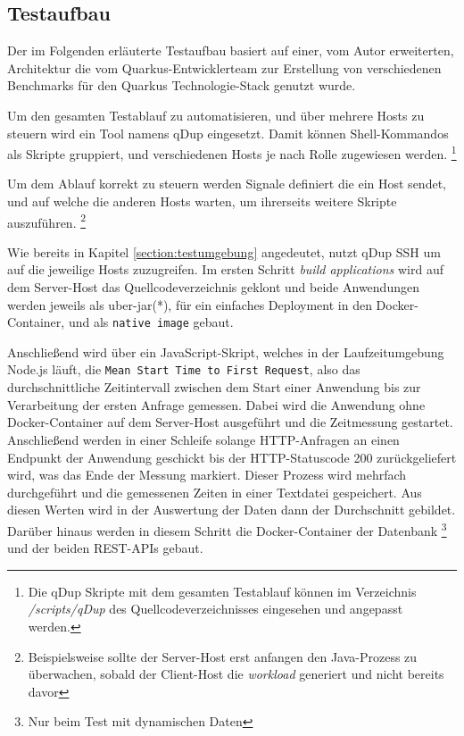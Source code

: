 \subsection{Testaufbau}
\label{section:testaufbau}
Der im Folgenden erläuterte Testaufbau basiert auf einer, vom Autor erweiterten, Architektur die vom Quarkus-Entwicklerteam
zur Erstellung von verschiedenen Benchmarks für den Quarkus Technologie-Stack genutzt wurde.
\parencite{QuarkusBlog, QuarkusJohnaohara}

Um den gesamten Testablauf zu automatisieren, und über mehrere Hosts zu steuern wird ein Tool namens qDup eingesetzt.
Damit können Shell-Kommandos als Skripte gruppiert, und verschiedenen Hosts je nach Rolle zugewiesen werden.
\footnote{Die qDup Skripte mit dem gesamten Testablauf können im Verzeichnis \textit{/scripts/qDup} des Quellcodeverzeichnisses eingesehen und
  angepasst werden.}

Um dem Ablauf korrekt zu steuern werden Signale definiert die ein Host sendet, und auf welche die anderen Hosts warten, um ihrerseits
weitere Skripte auszuführen.
\footnote{Beispielsweise sollte der Server-Host erst anfangen den Java-Prozess zu überwachen, sobald der Client-Host die \textit{workload}
  generiert und nicht bereits davor}

Wie bereits in Kapitel \ref{section:testumgebung} angedeutet, nutzt qDup SSH um auf die jeweilige Hosts zuzugreifen.
Im ersten Schritt \textit{build applications} wird auf dem Server-Host das Quellcodeverzeichnis geklont und beide Anwendungen werden
jeweils als \gls{uber-jar}(*), für ein einfaches Deployment in den Docker-Container, und als \verb|native image| gebaut.

Anschließend wird über ein JavaScript-Skript, welches in der Laufzeitumgebung Node.js läuft,
die \verb|Mean Start Time to First Request|, also das durchschnittliche Zeitintervall zwischen dem Start einer Anwendung bis
zur Verarbeitung der ersten Anfrage gemessen.
Dabei wird die Anwendung ohne Docker-Container auf dem Server-Host ausgeführt und die Zeitmessung gestartet. Anschließend werden in einer Schleife
solange HTTP-Anfragen an einen Endpunkt der Anwendung geschickt bis der HTTP-Statuscode 200 zurückgeliefert wird, was das Ende der Messung markiert.
Dieser Prozess wird mehrfach durchgeführt und die gemessenen Zeiten in einer Textdatei gespeichert.
Aus diesen Werten wird in der Auswertung der Daten dann der Durchschnitt gebildet.
Darüber hinaus werden in diesem Schritt die Docker-Container der Datenbank
\footnote{Nur beim Test mit dynamischen Daten} und der beiden REST-APIs gebaut.\newline

